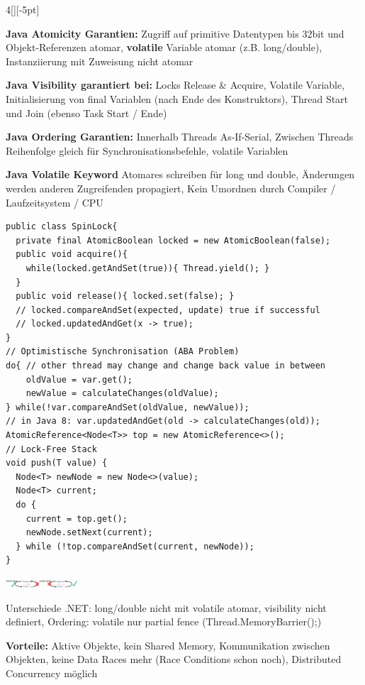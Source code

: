 \documentclass[%
	pdftex,%
	a4paper,%
	landscape,%
	ngerman,
	oneside,%
	6pt,%
	halfparskip,%
]{scrbook}
\newenvironment{mainbox}{%
  \def\FrameCommand{\fboxrule 1px \fcolorbox{black}{spec_blue}}%
  \MakeFramed {\advance\hsize-\width \FrameRestore}}%
 {\endMakeFramed}
\newcommand{\maintopic}[1]{\setcounter{subtopicenum}{0}\setcounter{subsubtopicenum}{0}\vspace{-4px}\begin{mainbox}\textcolor{white}{\textbf{\large{\stepcounter{maintopicenum}\Roman{maintopicenum}. #1}}}\end{mainbox}\vspace{-4px}}
\newenvironment{tight-itemize}
{ \begin{itemize}[leftmargin=*, nosep]
    \setlength{\itemsep}{0px}
    \setlength{\parskip}{0px}
    \setlength{\parsep}{0px}  }
{ \end{itemize}                  }
\begin{document}
\begin{multicols}{4}[][-5pt]
\begin{tight-itemize}
    \item{\textbf{Java Atomicity Garantien:} Zugriff auf primitive Datentypen bis 32bit und Objekt-Referenzen atomar, \textbf{volatile} Variable atomar (z.B. long/double), Instanziierung mit Zuweisung nicht atomar}
    \item{\textbf{Java Visibility garantiert bei:} Locks Release \& Acquire, Volatile Variable, Initialisierung von final Variablen (nach Ende des Konstruktors), Thread Start und Join (ebenso Task Start / Ende)}
    \item{\textbf{Java Ordering Garantien:} Innerhalb Threads As-If-Serial, Zwischen Threads Reihenfolge gleich für Synchronisationsbefehle, volatile Variablen}
    \item{\textbf{Java Volatile Keyword} Atomares schreiben für long und double, Änderungen werden anderen Zugreifenden propagiert, Kein Umordnen durch Compiler / Laufzeitsystem / CPU}
\end{tight-itemize}
\begin{lstlisting}
public class SpinLock{
  private final AtomicBoolean locked = new AtomicBoolean(false);
  public void acquire(){
    while(locked.getAndSet(true)){ Thread.yield(); }
  }
  public void release(){ locked.set(false); }
  // locked.compareAndSet(expected, update) true if successful
  // locked.updatedAndGet(x -> true);
}
// Optimistische Synchronisation (ABA Problem)
do{ // other thread may change and change back value in between
    oldValue = var.get();
    newValue = calculateChanges(oldValue);
} while(!var.compareAndSet(oldValue, newValue));
// in Java 8: var.updatedAndGet(old -> calculateChanges(old));
AtomicReference<Node<T>> top = new AtomicReference<>();
// Lock-Free Stack
void push(T value) {
  Node<T> newNode = new Node<>(value);
  Node<T> current;
  do {
    current = top.get();
    newNode.setNext(current);
  } while (!top.compareAndSet(current, newNode));
}
\end{lstlisting}
\begin{center}
    \includegraphics[width=0.2\textwidth]{img/volatile.png}
\end{center}
Unterschiede .NET: long/double nicht mit volatile atomar, visibility nicht definiert, Ordering: volatile nur partial fence (Thread.MemoryBarrier();)
\maintopic{Actor}
\begin{tight-itemize}
	\item{\textbf{Vorteile:} Aktive Objekte, kein Shared Memory, Kommunikation zwischen Objekten, keine Data Races mehr (Race Conditions schon noch), Distributed Concurrency möglich}

\end{tight-itemize}
\end{multicols}
\end{document}
